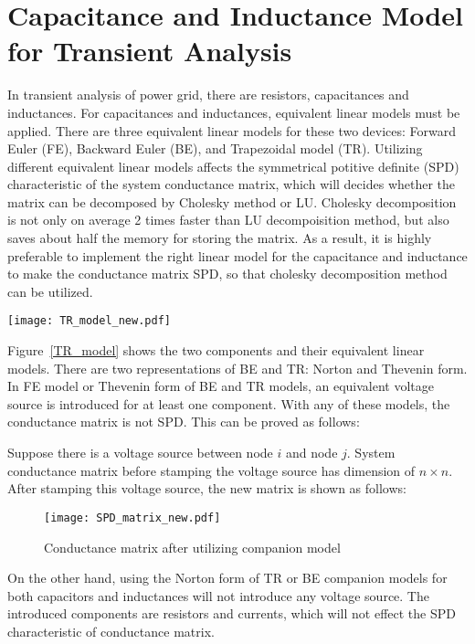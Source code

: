 \section{Capacitance and Inductance Model for Transient Analysis}
In transient analysis of power grid, there are resistors, capacitances and inductances. For capacitances and inductances, equivalent linear models must be applied. There are three equivalent linear models for these two devices: Forward Euler (FE), Backward Euler (BE), and Trapezoidal model (TR). Utilizing different equivalent linear models affects the symmetrical potitive definite (SPD) characteristic of the system conductance matrix, which will decides whether the matrix can be decomposed by Cholesky method or LU. Cholesky decomposition is not only on average 2 times faster than LU decompoisition method, but also saves about half the memory for storing the matrix. As a result, it is
highly preferable to implement the right linear model for the capacitance and inductance to make the conductance matrix SPD, so that cholesky decomposition method can be utilized. 
\begin{figure*}[htbp]
  \centering
  \texttt{[image: TR\_model\_new.pdf]}
  \caption{Companion models for capacitor and inductor.}
  \label{TR_model}
\end{figure*}

Figure~\ref{TR_model} shows the two components and their equivalent linear models. There are two representations of BE and TR: Norton and Thevenin form. In FE model or Thevenin form of BE and TR models, an equivalent voltage source is introduced for at least one component. 
With any of these models, the conductance matrix is not SPD. This can be proved as follows: 

Suppose there is a voltage source between node $i$ and node $j$. System conductance matrix before stamping the voltage source has dimension of $n\times n$. After stamping this voltage source, the new matrix is shown as follows:
\begin{figure}[htbp]
 \centering
 \texttt{[image: SPD\_matrix\_new.pdf]}
 \caption{Conductance matrix after utilizing companion model}
 \label{SPD_matrix}
\end{figure} 

On the other hand, using the Norton form of TR or BE companion models for both capacitors and inductances will not introduce any 
voltage source. The introduced components are resistors and currents, which will not effect the SPD characteristic of conductance matrix. 
 

